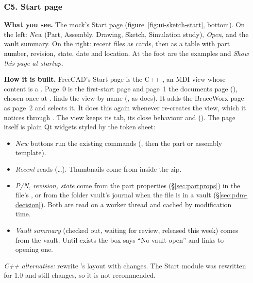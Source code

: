 \subsubsection*{C5. Start page}

\textbf{What you see.} The mock's Start page (figure~\ref{fig:ui-sketch-start}, bottom). On the left: \emph{New}
(Part, Assembly, Drawing, Sketch, Simulation study), \emph{Open}, and the vault summary. On the right: recent
files as cards, then as a table with part number, revision, state, date and location. At the foot are the
examples and \emph{Show this page at startup}.

\textbf{How it is built.} FreeCAD's Start page is the C++ , an MDI view whose content is
a . Page~0 is the first-start page and page~1 the documents page
(), chosen once at . 
finds the view by name (, as  does). It adds
the BruceWorx page as page~2 and selects it. It does this again whenever  re-creates the view,
which it notices through . The view keeps its tab, its close behaviour and
 (). The page itself is plain Qt widgets styled by the token sheet:
\begin{itemize}[nosep]
  \item \emph{New} buttons run the existing commands (, then the part or assembly template).
  \item \emph{Recent} reads  (\ldots). Thumbnails come from
         inside the  zip.
  \item \emph{P/N, revision, state} come from the part properties (\S\ref{sec:partprops}) in the file's
        , or from the folder vault's journal when the file is in a vault
        (\S\ref{sec:pdm-decision}). Both are read on a worker thread and cached by modification time.
  \item \emph{Vault summary} (checked out, waiting for review, released this week) comes from the vault. Until
         exists the box says ``No vault open'' and links to opening one.
\end{itemize}
\emph{C++ alternative:} rewrite 's layout with \code{[BW]} changes. The Start module was rewritten
for 1.0 and still changes, so it is not recommended.

